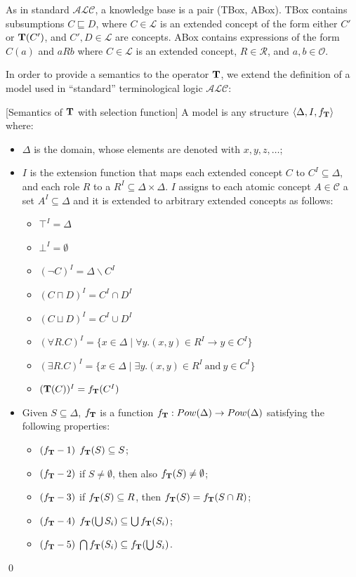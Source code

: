 \documentclass[a4paper, 11pt, oneside]{duthesis}
\newcommand{\tip}{{\bf T}}
\newcommand{\alc}{\mathcal{ALC}}
\newcommand{\vuoto} {\emptyset}
\newcommand{\nott} {\lnot}
\newcommand{\tc} {\mid}
\newcommand{\imp} {\rightarrow}
\newcommand{\elle} {\mathcal{L}}
\newenvironment{definition}
{\begin{defi} \rm}{\qed \end{defi}}
\newenvironment{definition}
{\begin{defi} \rm}{\qed \end{defi}}
\newtheorem{definition}{Definition}
\newcounter{posu}
\newtheorem{definition}[posu]{Definition}
\begin{document}
\noindent  As in standard $\mathcal{ALC}$, a knowledge base is a pair (TBox, ABox). TBox contains subsumptions $C \sqsubseteq D$, where $C \in \elle$ is an extended concept of the form either $C'$ or $\tip(C')$, and $C', D \in \elle$ are concepts.
ABox contains expressions of the form $C(a)$ and $aRb$ where $C \in \elle$ is an extended concept, $R \in \mathcal{R}$, and $a, b \in \mathcal{O}$.



In order to provide a semantics to the operator $\tip$, we extend the definition of a model used in ``standard'' terminological logic $\alc$:

\begin{definition}[Semantics of $\tip$ with selection function]\label{Semantics with f_tip} A model is any structure $\langle \Delta, I, f_\tip \rangle$ where:

\begin{itemize}
\item $\Delta$ is the domain, whose elements are denoted with $x, y, z, \dots$;
\item $I$ is the extension function that maps each extended concept $C$ to $C^I \subseteq \Delta$, and each role $R$ to a $R^I \subseteq \Delta \times \Delta$.
$I$ assigns to each atomic concept $A \in \mathcal{C}$ a set $A^I \subseteq \Delta$ and it is extended to arbitrary extended concepts as follows:

\begin{itemize}
  \item $\top^I=\Delta$
  \item $\bot^I=\vuoto$
  \item $(\nott C)^I=\Delta \backslash C^I$
  \item $(C \sqcap D)^I=C^I \cap D^I$
  \item $(C \sqcup D)^I=C^I \cup D^I$
  \item $(\forall R.C)^I=\{x \in \Delta \tc \forall y. (x,y) \in R^I \imp y \in C^I\}$
  \item $(\exists R.C)^I=\{x \in \Delta \tc \exists y.(x,y) \in R^I \ \mbox{and} \ y \in C^I\}$
  \item $(\tip(C))^I = f_\tip(C^I)$
\end{itemize}


\item Given $S \subseteq \Delta$, $f_\tip$ is a function $f_\tip : Pow(\Delta) \rightarrow Pow(\Delta)$ satisfying the following properties:

\begin{itemize}
\item $(f_\tip-1)$ $f_\tip(S) \subseteq S$;
\item $(f_\tip-2)$ if $S \neq \emptyset$, then also $f_\tip(S)
\neq \emptyset$;
\item $(f_\tip-3)$ if $f_\tip(S) \subseteq R$, then $f_\tip(S) = f_\tip(S \cap R)$;
\item $(f_\tip-4)$ $f_\tip(\bigcup S_i ) \subseteq \bigcup f_\tip(S_i)$;
\item $(f_\tip-5)$ $\bigcap f_\tip(S_i) \subseteq  f_\tip(\bigcup S_i)$.
\end{itemize}


\end{itemize}
\end{definition}
\end{document}
